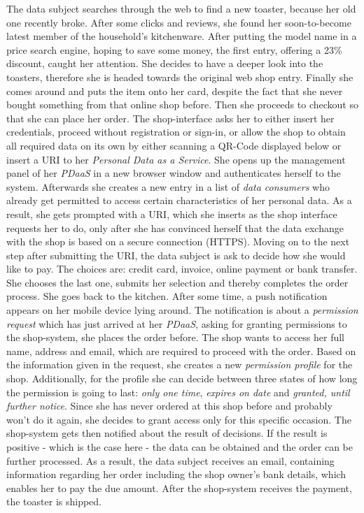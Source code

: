 \documentclass[12pt,english,a4paper,titlepage,cleardoublepage=empty,dottedtoc]{report}
\begin{document}
The data subject searches through the web to find a new toaster, because
her old one recently broke. After some clicks and reviews, she found her
soon-to-become latest member of the household's kitchenware. After
putting the model name in a price search engine, hoping to save some
money, the first entry, offering a 23\% discount, caught her attention.
She decides to have a deeper look into the toasters, therefore she is
headed towards the original web shop entry. Finally she comes around and
puts the item onto her card, despite the fact that she never bought
something from that online shop before. Then she proceeds to checkout so
that she can place her order. The shop-interface asks her to either
insert her credentials, proceed without registration or sign-in, or
allow the shop to obtain all required data on its own by either scanning
a QR-Code displayed below or insert a URI to her \emph{Personal Data as
a Service}. She opens up the management panel of her \emph{PDaaS} in a
new browser window and authenticates herself to the system. Afterwards
she creates a new entry in a list of \emph{data consumers} who already
get permitted to access certain characteristics of her personal data. As
a result, she gets prompted with a URI, which she inserts as the shop
interface requests her to do, only after she has convinced herself that
the data exchange with the shop is based on a secure connection (HTTPS).
Moving on to the next step after submitting the URI, the data subject is
ask to decide how she would like to pay. The choices are: credit card,
invoice, online payment or bank transfer. She chooses the last one,
submits her selection and thereby completes the order process. She goes
back to the kitchen. After some time, a push notification appears on her
mobile device lying around. The notification is about a \emph{permission
request} which has just arrived at her \emph{PDaaS}, asking for granting
permissions to the shop-system, she places the order before. The shop
wants to access her full name, address and email, which are required to
proceed with the order. Based on the information given in the request,
she creates a new \emph{permission profile} for the shop. Additionally,
for the profile she can decide between three states of how long the
permission is going to last: \emph{only one time}, \emph{expires on
date} and \emph{granted, until further notice}. Since she has never
ordered at this shop before and probably won't do it again, she decides
to grant access only for this specific occasion. The shop-system gets
then notified about the result of decisions. If the result is positive -
which is the case here - the data can be obtained and the order can be
further processed. As a result, the data subject receives an email,
containing information regarding her order including the shop owner's
bank details, which enables her to pay the due amount. After the
shop-system receives the payment, the toaster is shipped.
\end{document}
